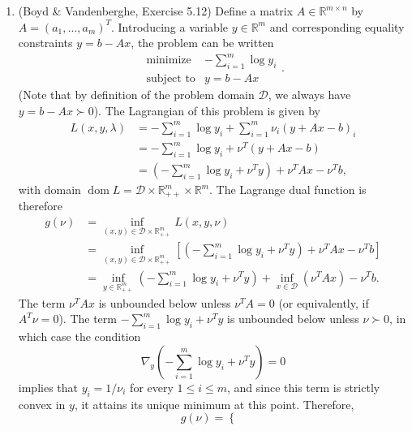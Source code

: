 \documentclass[letterpaper,12pt]{article}
\DeclareMathOperator{\dom}{dom}
\begin{document}
\begin{enumerate}
\item (Boyd \& Vandenberghe, Exercise 5.12) Define a matrix
  $A \in \mathbb{R}^{m \times n}$ by $A = (a_1, \ldots,
  a_m)^T$. Introducing a variable $y \in \mathbb{R}^m$ and
  corresponding equality constraints $y = b - Ax$, the problem can be
  written
  \begin{equation*}
    \begin{array}{ll}
      \text{minimize} & -\sum_{i=1}^m \log y_i \\
      \text{subject to}
        &y = b - Ax
    \end{array}.
  \end{equation*}
  (Note that by definition of the problem domain $\mathcal{D}$, we
  always have $y = b - Ax \succ 0$). The Lagrangian of this problem is
  given by
  \begin{align*}
    L(x, y, \lambda)
      &= -\sum_{i=1}^m \log y_i + \sum_{i=1}^m \nu_i (y + Ax - b)_i \\
      &= -\sum_{i=1}^m \log y_i + \nu^T (y + Ax - b) \\
      &= \left( -\sum_{i=1}^m \log y_i + \nu^T y \right) + \nu^T Ax - \nu^T b,
  \end{align*}
  with domain
  $\dom L = \mathcal{D} \times \mathbb{R}_{++}^m \times
  \mathbb{R}^m$. The Lagrange dual function is therefore
  \begin{align*}
    g(\nu)
      &= \inf_{(x, y) \in \mathcal{D} \times \mathbb{R}_{++}^m} L(x, y, \nu) \\
      &= \inf_{(x, y) \in \mathcal{D} \times \mathbb{R}_{++}^m}
         \left[ \left( -\sum_{i=1}^m \log y_i + \nu^T y \right)
         + \nu^T Ax - \nu^T b \right] \\
      &= \inf_{y \in \mathbb{R}_{++}^m}
         \left( -\sum_{i=1}^m \log y_i + \nu^T y \right)
         + \inf_{x \in \mathcal{D}} (\nu^T Ax) - \nu^T b.
  \end{align*}
  The term $\nu^T Ax$ is unbounded below unless $\nu^TA = 0$ (or
  equivalently, if $A^T \nu = 0$). The term
  $-\sum_{i=1}^m \log y_i + \nu^T y$ is unbounded below unless
  $\nu \succ 0$, in which case the condition
  \begin{equation*}
    \nabla_y \left( -\sum_{i=1}^m \log y_i + \nu^T y \right) = 0
  \end{equation*}
  implies that $y_i = 1 / \nu_i$ for every $1 \leq i \leq m$, and
  since this term is strictly convex in $y$, it attains its unique
  minimum at this point. Therefore,
  \begin{equation*}
    g(\nu) = \begin{cases}

\end{cases}
\end{equation*}
\end{enumerate}
\end{document}

